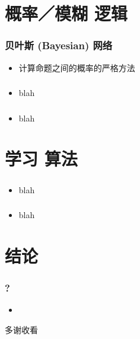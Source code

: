\documentclass[15pt]{beamer}
\begin{document}
\section[Section]{概率／模糊 逻辑}
\frame{\sectionpage}

\begin{frame}
\frametitle{贝叶斯 (Bayesian) 网络}
\begin{itemize}
	\item 计算命题之间的概率的严格方法
\end{itemize}
\end{frame}

\begin{frame}
\frametitle{}
\begin{itemize}
	\item blah
\end{itemize}
\end{frame}

\begin{frame}
\frametitle{}
\begin{itemize}
	\item blah
\end{itemize}
\end{frame}

\section[Section]{学习 算法}
\frame{\sectionpage}

\begin{frame}
\frametitle{}
\begin{itemize}
	\item blah
\end{itemize}
\end{frame}

\begin{frame}
\frametitle{}
\begin{itemize}
	\item blah
\end{itemize}
\end{frame}

\section*{结论}

\begin{frame}
\frametitle{?}
\begin{itemize}
	\item
\end{itemize}
	\begin{center}
		多谢收看 \smiley{}
	\end{center}
\end{frame}
\end{document}
